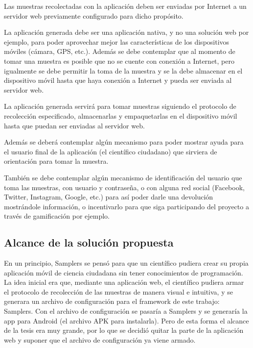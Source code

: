 Las muestras recolectadas con la aplicación deben ser enviadas por Internet a un servidor web previamente configurado para dicho propósito.

La aplicación generada debe ser una aplicación nativa, y no una solución web por ejemplo, para poder aprovechar mejor las características de los dispositivos móviles (cámara, GPS, etc.). Además se debe contemplar que al momento de tomar una muestra es posible que no se cuente con conexión a Internet, pero igualmente se debe permitir la toma de la muestra y se la debe almacenar en el dispositivo móvil hasta que haya conexión a Internet y pueda ser enviada al servidor web.

La aplicación generada servirá para tomar muestras siguiendo el protocolo de recolección especificado, almacenarlas y empaquetarlas en el dispositivo móvil hasta que puedan ser enviadas al servidor web.

Además se deberá contemplar algún mecanismo para poder mostrar ayuda para el usuario final de la aplicación (el científico ciudadano) que sirviera de orientación para tomar la muestra. 

También se debe contemplar algún mecanismo de identificación del usuario que toma las muestras, con usuario y contraseña, o con alguna red social (Facebook, Twitter, Instagram, Google, etc.) para así poder darle una devolución mostrándole información, o incentivarlo para que siga participando del proyecto a través de gamificación por ejemplo.



\subsection{Alcance de la solución propuesta}
En un principio, Samplers se pensó para que un científico pudiera crear su propia aplicación móvil de ciencia ciudadana sin tener conocimientos de programación. 
La idea inicial era que, mediante una aplicación web, el científico pudiera armar el protocolo de recolección de las muestras de manera visual e intuitiva, y se generara un archivo de configuración para el framework de este trabajo: Samplers. 
Con el archivo de configuración se pasaría a Samplers y se generaría la app para Android (el archivo APK para instalarla). 
Pero de esta forma el alcance de la tesis era muy grande, por lo que se decidió quitar la parte de la aplicación web y suponer que el archivo de configuración ya viene armado.

